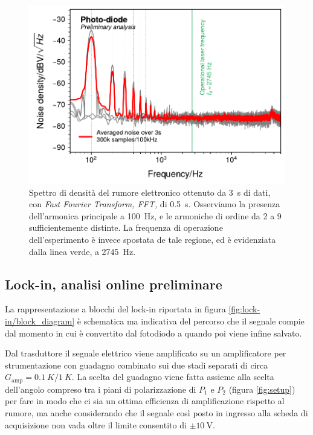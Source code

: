 \documentclass[
    prb,altaffilletter,citeautoscript,
    amsmath,amssymb,
    showpacs,showkeys,floatfix,
    reprint
]{revtex4-1}
\begin{document}
\begin{figure}
    \centering
    \includegraphics[width=\linewidth]{figures/noise_nds.pdf}
    \caption{Spettro di densità\cite{welchUseFastFourier1967a} del rumore elettronico ottenuto da \SI{3}{\second} di dati, con \emph{Fast Fourier Transform, FFT,} di \SI{0.5}{\second}. Osserviamo la presenza dell'armonica principale a \SI{100}{\hertz}, e le armoniche di ordine da 2 a 9 sufficientemente distinte. La frequenza di operazione dell'esperimento è invece spostata de tale regione, ed è evidenziata dalla linea verde, a \SI{2745}{\hertz}.}
    \label{fig:NDS}
\end{figure}

\subsection{Lock-in, analisi online preliminare}

La rappresentazione a blocchi del lock-in\cite{scofieldFrequencydomainDescriptionLockin1994} riportata in figura \ref{fig:lock-in/block_diagram} è schematica ma indicativa del percorso che il segnale compie dal momento in cui è convertito dal fotodiodo a quando poi viene infine salvato. 

Dal trasduttore il segnale elettrico viene amplificato su un amplificatore per strumentazione con guadagno combinato sui due stadi separati di circa $G_\mathrm{amp}=\SI{0.1}{K}/\SI{1}{K}$. La scelta del guadagno viene fatta assieme alla scelta dell'angolo compreso tra i piani di polarizzazione di $P_1$ e $P_2$ (figura \ref{fig:setup}) per fare in modo che ci sia un ottima efficienza di amplificazione rispetto al rumore, ma anche considerando che il segnale così posto in ingresso alla scheda di acquisizione non vada oltre il limite consentito di $\pm\SI{10}{\volt}$. 
\end{document}
